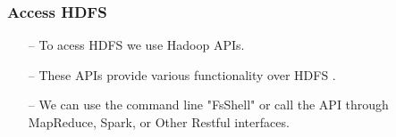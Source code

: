 \begin{frame}[c]{ }
	\frametitle{Access HDFS }
	
	
	\begin{itemize}  [<+->]
		\item [--] {\footnotesize To acess HDFS we use Hadoop APIs. }
		\item [--] {\footnotesize These APIs provide various functionality over HDFS . }
		\item [--] {\footnotesize We can use the command line "FsShell" or call the API through MapReduce, Spark, or Other Restful interfaces.}
		
		
	\end{itemize}
	
\end{frame}
